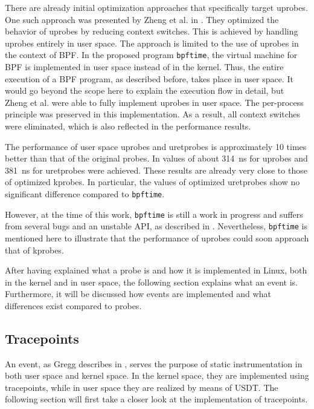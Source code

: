 There are already initial optimization approaches that specifically target \acp{uprobe}.  
One such approach was presented by Zheng et al. in \cite{zheng2023bpftimeuserspaceebpfruntime}.  
They optimized the behavior of \acp{uprobe} by reducing context switches.  
This is achieved by handling \acp{uprobe} entirely in user space.  
The approach is limited to the use of \acp{uprobe} in the context of \ac{BPF}.  
In the proposed program \texttt{bpftime}, the virtual machine for \ac{BPF} is implemented in user space instead of in the kernel.  
Thus, the entire execution of a \ac{BPF} program, as described before, takes place in user space.  
It would go beyond the scope here to explain the execution flow in detail, but Zheng et al. were able to fully implement \acp{uprobe} in user space.  
The per-process principle was preserved in this implementation.  
As a result, all context switches were eliminated, which is also reflected in the performance results.  

The performance of user space \acp{uprobe} and \acp{uretprobe} is approximately 10 times better than that of the original probes.  
In \cite[p. 7]{zheng2023bpftimeuserspaceebpfruntime} values of about 314~ns for \acp{uprobe} and 381~ns for \acp{uretprobe} were achieved.  
These results are already very close to those of optimized \acp{kprobe}.  
In particular, the values of optimized \acp{uretprobe} show no significant difference compared to \texttt{bpftime}.  

However, at the time of this work, \texttt{bpftime} is still a work in progress and suffers from several bugs and an unstable API, as described in \cite{bpftime}.  
Nevertheless, \texttt{bpftime} is mentioned here to illustrate that the performance of \acp{uprobe} could soon approach that of \acp{kprobe}.  

After having explained what a probe is and how it is implemented in Linux, both in the kernel and in user space, the following section explains what an event is.  
Furthermore, it will be discussed how events are implemented and what differences exist compared to probes.  
 \subsection{Tracepoints}
An event, as Gregg describes in \cite[Chap. 2.9, Chap. 2.10]{Gregg_2020}, serves the purpose of static instrumentation in both user space and kernel space.  
In the kernel space, they are implemented using tracepoints, while in user space they are realized by means of \ac{USDT}.  
The following section will first take a closer look at the implementation of tracepoints.  

